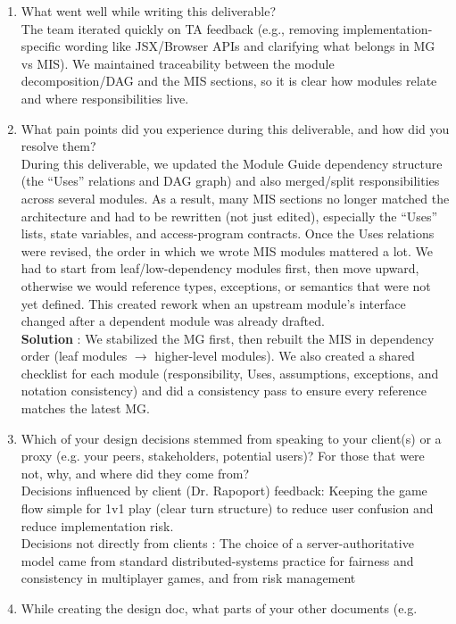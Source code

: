 \documentclass[12pt, titlepage]{article}
\begin{document}
\begin{enumerate}
  \item What went well while writing this deliverable? \\
The team iterated quickly on TA feedback (e.g., removing implementation-specific wording like JSX/Browser APIs and clarifying what belongs in MG vs MIS).
We maintained traceability between the module decomposition/DAG and the MIS sections, so it is clear how modules relate and where responsibilities live.
  \item What pain points did you experience during this deliverable, and how
    did you resolve them?\\
During this deliverable, we updated the Module Guide dependency structure (the ``Uses'' relations and DAG graph) and also merged/split responsibilities across several modules. As a result, many MIS sections no longer matched the architecture and had to be rewritten (not just edited), especially the ``Uses'' lists, state variables, and access-program contracts. Once the Uses relations were revised, the order in which we wrote MIS modules mattered a lot. We had to start from leaf/low-dependency modules first, then move upward, otherwise we would reference types, exceptions, or semantics that were not yet defined. This created rework when an upstream module's interface changed after a dependent module was already drafted. \\
\textbf{Solution} : We stabilized the MG first, then rebuilt the MIS in dependency order (leaf modules $\rightarrow$ higher-level modules). We also created a shared checklist for each module (responsibility, Uses, assumptions, exceptions, and notation consistency) and did a consistency pass to ensure every reference matches the latest MG.
  \item Which of your design decisions stemmed from speaking to your client(s)
  or a proxy (e.g. your peers, stakeholders, potential users)? For those that
  were not, why, and where did they come from?\\
Decisions influenced by client (Dr. Rapoport) feedback: Keeping the game flow simple for 1v1 play (clear turn structure) to reduce user confusion and reduce implementation risk.\\
Decisions not directly from clients : The choice of a server-authoritative model came from standard distributed-systems practice for fairness and consistency in multiplayer games, and from risk management
  \item While creating the design doc, what parts of your other documents (e.g.

\end{enumerate}
\end{document}
